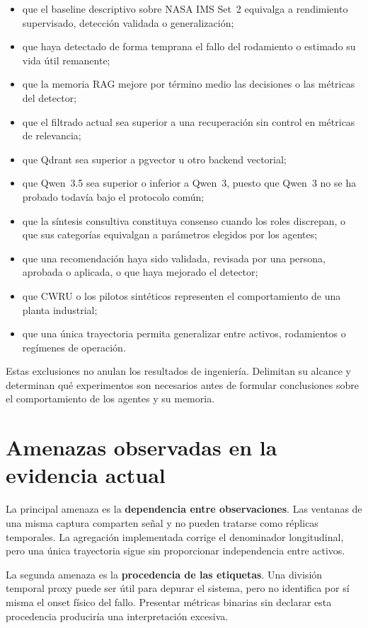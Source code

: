 \begin{itemize}
  \item que el baseline descriptivo sobre NASA IMS Set~2 equivalga a rendimiento
        supervisado, detección validada o generalización;
  \item que haya detectado de forma temprana el fallo del rodamiento o estimado
        su vida útil remanente;
  \item que la memoria RAG mejore por término medio las decisiones o las
        métricas del detector;
  \item que el filtrado actual sea superior a una recuperación sin control en
        métricas de relevancia;
  \item que Qdrant sea superior a pgvector u otro backend vectorial;
  \item que Qwen~3.5 sea superior o inferior a Qwen~3, puesto que Qwen~3 no se
        ha probado todavía bajo el protocolo común;
  \item que la síntesis consultiva constituya consenso cuando los roles
        discrepan, o que sus categorías equivalgan a parámetros elegidos por
        los agentes;
  \item que una recomendación haya sido validada, revisada por una persona,
        aprobada o aplicada, o que haya mejorado el detector;
  \item que CWRU o los pilotos sintéticos representen el comportamiento de una
        planta industrial;
  \item que una única trayectoria permita generalizar entre activos,
        rodamientos o regímenes de operación.
\end{itemize}

Estas exclusiones no anulan los resultados de ingeniería. Delimitan su alcance
y determinan qué experimentos son necesarios antes de formular conclusiones
sobre el comportamiento de los agentes y su memoria.

\section{Amenazas observadas en la evidencia actual}

La principal amenaza es la \textbf{dependencia entre observaciones}. Las
ventanas de una misma captura comparten señal y no pueden tratarse como réplicas
temporales. La agregación implementada corrige el denominador longitudinal,
pero una única trayectoria sigue sin proporcionar independencia entre activos.

La segunda amenaza es la \textbf{procedencia de las etiquetas}. Una división
temporal proxy puede ser útil para depurar el sistema, pero no identifica por sí
misma el onset físico del fallo. Presentar métricas binarias sin declarar esta
procedencia produciría una interpretación excesiva.


